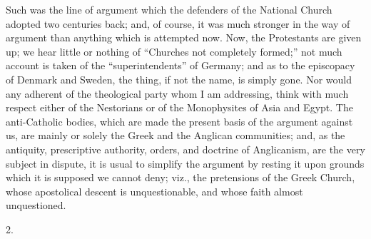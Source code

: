 Such was the line of argument which the defenders of the National
Church adopted two centuries back; and, of course, it was much
stronger in the way of argument than anything which is attempted now.
Now, the Protestants are given up; we hear little or nothing of
``Churches not completely formed;'' not much account is taken
of the ``superintendents'' of Germany; and as to the
episcopacy of Denmark and Sweden, the thing, if not the name, is
simply gone. Nor would any adherent of the theological party whom I am
addressing, think with much respect either of the Nestorians or of the
Monophysites of Asia and Egypt. The anti-Catholic bodies, which are
made the present basis of the argument against us, are mainly or
solely the Greek and the Anglican communities; and, as the antiquity,
prescriptive authority, orders, and doctrine of Anglicanism, are the
very subject in dispute, it is usual to simplify the argument by
resting it upon grounds which it is supposed we cannot deny; viz., the
pretensions of the Greek Church, whose apostolical descent is
unquestionable, and whose faith almost unquestioned.

2.

